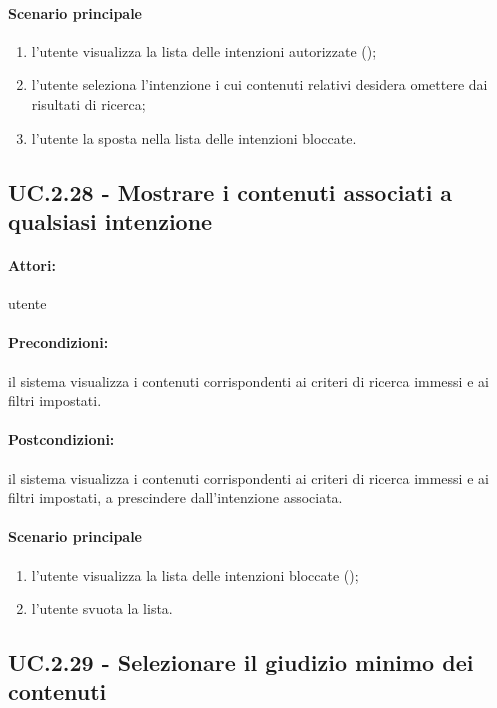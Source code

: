 \documentclass[10pt,a4paper,headinclude,footinclude,hidelinks]{scrreprt} %
\begin{document}
	\paragraph{Scenario principale}
	\begin{enumerate}
	\item l'utente visualizza la lista delle intenzioni autorizzate ();
	\item l'utente seleziona l'intenzione i cui contenuti relativi desidera omettere dai risultati di ricerca;
	\item l'utente la sposta nella lista delle intenzioni bloccate.
	\end{enumerate}

	\subsection[UC.2.28]{UC.2.28 - Mostrare i contenuti associati a qualsiasi intenzione}
	\label{sec:stage:ar:uc:2_28}
	\paragraph{Attori:} utente
	\paragraph{Precondizioni:} il sistema visualizza i contenuti corrispondenti ai criteri di ricerca immessi e ai filtri impostati.
	\paragraph{Postcondizioni:} il sistema visualizza i contenuti corrispondenti ai criteri di ricerca immessi e ai filtri impostati, a prescindere dall'intenzione associata.
	\paragraph{Scenario principale}
	\begin{enumerate}
	\item l'utente visualizza la lista delle intenzioni bloccate ();
	\item l'utente svuota la lista.
	\end{enumerate}

	\subsection[UC.2.29]{UC.2.29 - Selezionare il giudizio minimo dei contenuti}
	\label{sec:stage:ar:uc:2_29}
\end{document}
